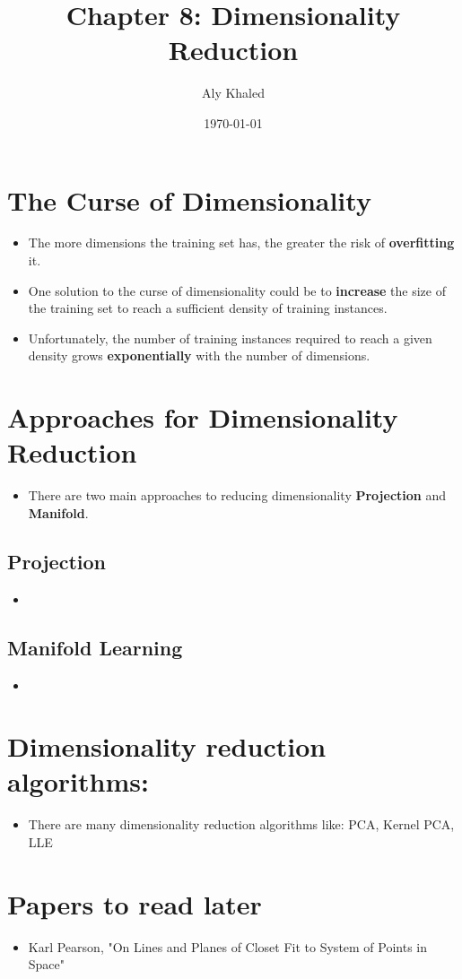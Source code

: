 \documentclass{article}
\title{Chapter 8: Dimensionality Reduction}
\author{Aly Khaled}
\date{\today}
\begin{document}
 
    \maketitle
    \section{The Curse of Dimensionality}
    \begin{itemize}
    	\item The more dimensions the training set has, the greater the risk of \textbf{overfitting} it.
    	\item One solution to the curse of dimensionality could be to \textbf{increase} the size of the training set to reach a sufficient density of training instances.
    	\item Unfortunately, the number of training instances required to reach a given density grows \textbf{exponentially} with the number of dimensions.
    \end{itemize}
    \section{Approaches for Dimensionality Reduction}
    \begin{itemize}
    	\item There are two main approaches to reducing dimensionality \textbf{Projection} and \textbf{Manifold}.
	\end{itemize}
	\subsection{Projection}
	\begin{itemize}
		\item 
	\end{itemize}	        
	\subsection{Manifold Learning}
	\begin{itemize}
		\item 
	\end{itemize}
	\section{Dimensionality reduction algorithms:}	
	\begin{itemize}
		\item There are many dimensionality reduction algorithms like: PCA, Kernel PCA, LLE
	\end{itemize}
						
    \section*{Papers to read later}
    \begin{itemize}
    	\item Karl Pearson, "On Lines and Planes of Closet Fit to System of Points in Space"
    \end{itemize}
\end{document}
